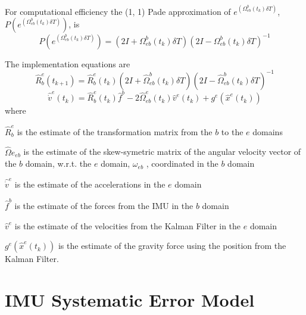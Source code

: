 \documentclass[a4paper]{report}
\numberwithin{equation}{chapter}
\begin{document}
For computational efficiency the (1, 1) Pade approximation of $e^{\left( \Omega^b_{eb} \left( t_k \right) \delta{T} \right)}$, $P \left(e^{\left( \Omega^b_{eb} \left( t_k \right) \delta{T} \right)} \right)$, is
\begin{equation}
P \left( e^{\left( \Omega^b_{eb} \left( t_k \right) \delta{T} \right)} \right) = \left( 2I + \Omega^b_{eb} \left( t_k \right) \delta{T} \right)\left( 2I - \Omega^b_{eb} \left( t_k \right) \delta{T} \right)^{-1}
\end{equation}

\bigskip

The implementation equations are
\begin{equation}
\hat{R}^e_b \left( t_{k + 1} \right) = \hat{R}^e_b \left( t_k \right) \left( 2I + \hat{\Omega}^b_{eb} \left( t_k \right) \delta{T} \right)\left( 2I - \hat{\Omega}^b_{eb} \left( t_k \right) \delta{T} \right)^{-1}
\end{equation}
\begin{equation}
\hat{\dot{v}}^e \left( t_k \right) = \hat{R}^e_b \left( t_k \right) \hat{f}^b - 2 \hat{\Omega}^e_{eb} \left( t_k \right) \hat{v}^e \left( t_k \right) + g^e \left( \hat{x}^e \left( t_k \right) \right)
\end{equation}
where

  $\hat{R}^e_b$ is the estimate of the transformation matrix from the $b$ to the $e$ domains

  $\hat{\Omega}e_{eb}$ is the estimate of the skew-symetric matrix of the angular velocity vector of the $b$ domain, w.r.t. the $e$ domain, $\omega_{eb}$ , coordinated in the $b$ domain

  $\hat{\dot{v}}^e$ is the estimate of the accelerations in the $e$ domain

  $\hat{f}^b$ is the estimate of the forces from the IMU in the $b$ domain

  $\hat{v}^e$ is the estimate of the velocities from the Kalman Filter in the $e$ domain

  $g^e \left( \hat{x}^e \left(t_k \right) \right)$ is the estimate of the gravity force using the position from the Kalman Filter.

\section[IMU Systematic Error Model]{IMU Systematic Error Model}
\end{document}
